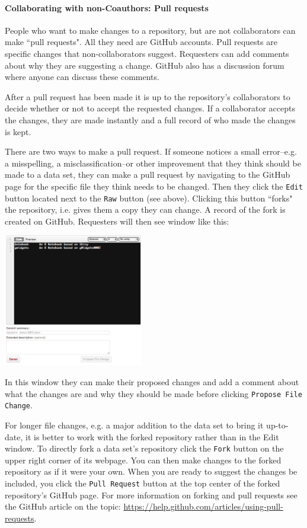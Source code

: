 \documentclass[twocolumn]{article}\usepackage{graphicx, color}
\begin{document}
\paragraph{Collaborating with non-Coauthors: Pull requests}

People who want to make changes to a repository, but are not collaborators can make ``pull requests". All they need are GitHub accounts. Pull requests are specific changes that non-collaborators suggest. Requesters can add comments about why they are suggesting a change. GitHub also has a discussion forum where anyone can discuss these comments. 

After a pull request has been made it is up to the repository's collaborators to decide whether or not to accept the requested changes. If a collaborator accepts the changes, they are made instantly and a full record of who made the changes is kept.

There are two ways to make a pull request. If someone notices a small error--e.g. a misspelling, a misclassification--or other improvement that they think should be made to a data set, they can make a pull request by navigating to the GitHub page for the specific file they think needs to be changed. Then they click the \texttt{Edit} button located next to the \texttt{Raw} button (see above). Clicking this button ``forks" the repository, i.e. gives them a copy they can change. A record of the fork is created on GitHub. Requesters will then see  window like this:

\begin{center}
	\includegraphics[width=0.46\textwidth]{images/PullRequest.png}
\end{center}

\noindent In this window they can make their proposed changes and add a comment about what the changes are and why they should be made before clicking \texttt{Propose File Change}.

For longer file changes, e.g. a major addition to the data set to bring it up-to-date, it is better to work with the forked repository rather than in the Edit window. To directly fork a data set's repository click the \texttt{Fork} button on the upper right corner of its webpage. You can then make changes to the forked repository as if it were your own. When you are ready to suggest the changes be included, you click the \texttt{Pull Request} button at the top center of the forked repository's GitHub page. For more information on forking and pull requests see the GitHub article on the topic: \url{https://help.github.com/articles/using-pull-requests}.
\end{document}
